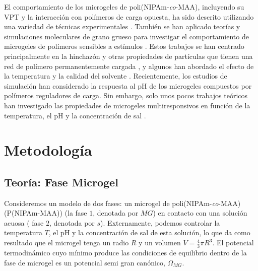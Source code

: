 El comportamiento de los microgeles de poli(NIPAm-\emph{co}-MAA), incluyendo su VPT y la interacci\'on con pol\'imeros de carga opuesta, ha sido descrito utilizando una variedad de t\'ecnicas experimentales \cite{Hoare2004,Dowding2000,Kleinen2008,Kleinen2010,Giussi2015,Su2016,Giussi2020}.
Tambi\'en se han aplicado teor\'ias y simulaciones moleculares de grano grueso para investigar el comportamiento de microgeles de pol\'imeros sensibles a est\'imulos \cite{quesada2011gel,ahualli2016coarse,Landsgesell2019SM}.
Estos trabajos se han centrado principalmente en la hinchaz\'on y otras propiedades de part\'iculas que tienen una red de pol\'imero permanentemente cargada \cite{Levin2002,Claudio2009,Colla2014,Jha2011,jha2012understanding,QuesadaPerez2013,QuesadaPerez2014,Kobayashi2014,Kobayashi2016,Rizzi2016,moncho-jorda2016a,Kobayashi2017,AdroherBenitez2017PCCP}, y algunos han abordado el efecto de la temperatura y la calidad del solvente \cite{Jha2011,QuesadaPerez2013,QuesadaPerez2014,moncho-jorda2016a,ahualli2016coarse,AdroherBenitez2017PCCP}.
Recientemente, los estudios de simulaci\'on han considerado la respuesta al pH de los microgeles compuestos por pol\'imeros reguladores de carga\cite{Schroeder2015,Rudov2017,Sean2018,Hofzumahaus2018,Lu2019}.
Sin embargo, solo unos pocos trabajos te\'oricos han investigado las propiedades de microgeles multiresponsivos en funci\'on de la temperatura, el pH y la concentraci\'on de sal \cite{CaprilesGonzalez2008,polotsky2013collapse}.


\section{Metodolog\'ia}
\subsection{Teor\'ia: Fase Microgel}\label{sec:gel:theory}


Consideremos un modelo de dos fases: un microgel de poli(NIPAm-\emph{co}-MAA) (P(NIPAm-MAA)) (la fase $1$, denotada por $MG$) en contacto con una soluci\'on acuosa ( fase $2$, denotada por $s$).
Externamente, podemos controlar la temperatura $T$, el pH y la concentraci\'on de sal de esta soluci\'on, lo que da como resultado que el microgel tenga un radio $R$ y un volumen $V=\frac{4}{3}\pi R^3$.
El potencial termodin\'amico cuyo m\'inimo produce las condiciones de equilibrio dentro de la fase de microgel es un  potencial semi gran can\'onico, $\Omega_{MG}$.

